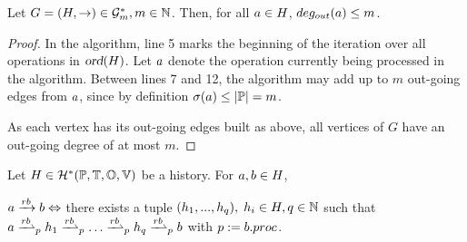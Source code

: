 \setcounter{lemma}{0}
\setcounter{proposition}{0}
\begin{lemma}
Let $G=(H,\rightarrow)\in\mathcal{G}^*_m,m\in\mathbb{N}$. Then, for all $a\in H$, \mbox{$deg_{out}(a) \leq m$}.
\end{lemma}
\begin{proof}
In the algorithm, line 5 marks the beginning of the iteration over all operations in $\textsl{ord}(H)$.
Let $a$ denote the operation currently being processed in the algorithm. Between lines 7 and 12, the algorithm may add up to $m$ out-going edges from $a$, since by definition $\sigma(a)\leq |\mathbb{P}|=m$.

As each vertex has its out-going edges built as above, all vertices of $G$ have an out-going degree of at most $m$.

\end{proof}


\begin{proposition}
Let $H\in\mathcal{H}^*(\mathbb{P}, \mathbb{T}, \mathbb{O}, \mathbb{V})$ be a history. For $a,b \in H$,

\begin{center}
$a\xrightarrow{rb}b \Leftrightarrow $ there exists a tuple $(h_1,...,h_q),\; h_i \in H, q\in\mathbb{N}$ such that 
$\opa \dsucp{p} \oph_1 \dsucp{p} \hdots \dsucp{p} \oph_q \dsucp{p} \opb$ with  $p:=b.proc$.
\end{center}
\end{proposition}

